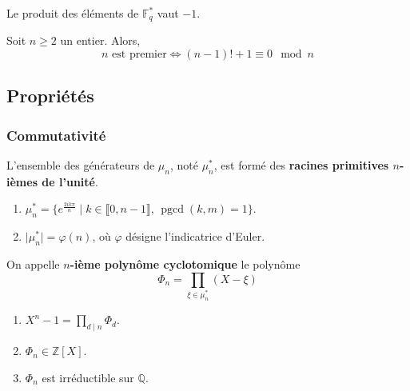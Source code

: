   \begin{corollary}
    Le produit des éléments de $\mathbb{F}_q^*$ vaut $-1$.
  \end{corollary}

  \begin{application}
    Soit $n \geq 2$ un entier. Alors,
    \[ n \text{ est premier} \iff (n-1)!+1 \equiv 0 \mod n \]
  \end{application}

  \subsection{Propriétés}

  \subsubsection{Commutativité}


  \begin{definition}
    L'ensemble des générateurs de $\mu_n$, noté $\mu_n^*$, est formé des \textbf{racines primitives $n$-ièmes de l'unité}.
  \end{definition}

  \begin{proposition}
    \begin{enumerate}[label={\bfseries(\roman*)}]
      \item $\mu_n^* = \{ e^{\frac{2ik\pi}{n}} \mid k \in \llbracket 0, n-1 \rrbracket, \, \operatorname{pgcd}(k, m) = 1 \}$.
      \item $\vert \mu_n^* \vert = \varphi(n)$, où $\varphi$ désigne l'indicatrice d'Euler.
    \end{enumerate}
  \end{proposition}

  \begin{definition}
    On appelle \textbf{$n$-ième polynôme cyclotomique} le polynôme
    \[ \Phi_n = \prod_{\xi \in \mu_n^*} (X - \xi) \]
  \end{definition}

  \begin{theorem}
    \begin{enumerate}[label={\bfseries(\roman*)}]
      \item $X^n - 1 = \prod_{d \mid n} \Phi_d$.
      \item $\Phi_n \in \mathbb{Z}[X]$.
      \item $\Phi_n$ est irréductible sur $\mathbb{Q}$.
    \end{enumerate}
  \end{theorem}

